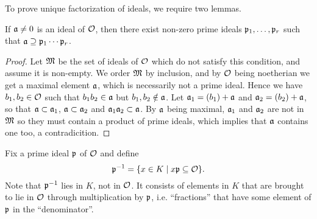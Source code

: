To prove unique factorization of ideals, we require two lemmas.

\begin{lem}
	If $\mathfrak{a}\neq 0$ is an ideal of $\mathcal{O}$, then there exist non-zero prime ideals $\mathfrak{p}_1,\dots,\mathfrak{p}_r$ such that $\mathfrak{a}\supseteq\mathfrak{p}_1\cdots\mathfrak{p}_r$.
\end{lem}
\begin{proof}
	Let $\mathfrak{M}$ be the set of ideals of $\mathcal{O}$ which do not satisfy this condition, and assume it is non-empty. We order $\mathfrak{M}$ by inclusion, and by $\mathcal{O}$ being noetherian we get a maximal element $\mathfrak{a}$, which is necessarily not a prime ideal. Hence we have $b_1,b_2\in\mathcal{O}$ such that $b_1b_2\in\mathfrak{a}$ but $b_1,b_2\notin\mathfrak{a}$. Let $\mathfrak{a}_1 = (b_1) + \mathfrak{a}$ and $\mathfrak{a}_2 = (b_2) + \mathfrak{a}$, so that $\mathfrak{a}\subset\mathfrak{a}_1$, $\mathfrak{a}\subset\mathfrak{a}_2$ and $\mathfrak{a}_1\mathfrak{a}_2\subset\mathfrak{a}$. By $\mathfrak{a}$ being maximal, $\mathfrak{a}_1$ and $\mathfrak{a}_2$ are not in $\mathfrak{M}$ so they must contain a product of prime ideals, which implies that $\mathfrak{a}$ contains one too, a contradicition.
\end{proof}

Fix a prime ideal $\mathfrak{p}$ of $\mathcal{O}$ and define
\[
	\mathfrak{p}^{-1} = \{x\in K\mid x\mathfrak{p}\subseteq\mathcal{O}\}.
\]
Note that $\mathfrak{p}^{-1}$ lies in $K$, not in $\mathcal{O}$. It consists of elements in $K$ that are brought to lie in $\mathcal{O}$ through multiplication by $\mathfrak{p}$, i.e. ``fractions'' that have some element of $\mathfrak{p}$ in the ``denominator''.

